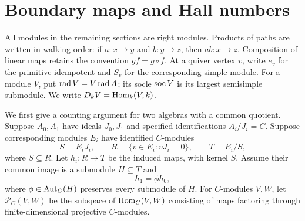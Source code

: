 \section{Boundary maps and Hall numbers}\label{sec:boundary}
All modules in the remaining sections are right modules. Products of paths are written in walking order: if $a:x\to y$ and $b:y\to z$, then $ab:x\to z$. Composition of linear maps retains the convention $gf=g\circ f$. At a quiver vertex $v$, write $e_v$ for the primitive idempotent and $S_v$ for the corresponding simple module. For a module $V$, put $\operatorname{rad} V=V\operatorname{rad} A$; its socle $\operatorname{soc} V$ is its largest semisimple submodule. We write $D_kV=\operatorname{Hom}_k(V,k)$.

We first give a counting argument for two algebras with a common quotient. Suppose $A_0,A_1$ have ideals $J_0,J_1$ and specified identifications $A_i/J_i=C$. Suppose corresponding modules $E_i$ have identified $C$-modules
\[
 S=E_iJ_i,\qquad R=\{v\in E_i:vJ_i=0\},\qquad T=E_i/S,
\]
where $S\subseteq R$. Let $h_i:R\to T$ be the induced maps, with kernel $S$. Assume their common image is a submodule $H\subseteq T$ and
\begin{equation}\label{eq:boundary-shear}
 h_1=\phi h_0,
\end{equation}
where $\phi\in\operatorname{Aut}_C(H)$ preserves every submodule of $H$. For $C$-modules $V,W$, let $\mathcal P_C(V,W)$ be the subspace of $\operatorname{Hom}_C(V,W)$ consisting of maps factoring through finite-dimensional projective $C$-modules.

